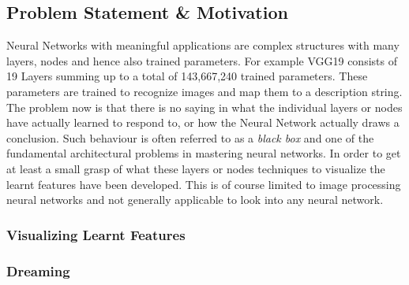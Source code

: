 \subsection{Problem Statement \& Motivation}
\label{sec:problemstatement}
Neural Networks with meaningful applications are complex structures with many layers, nodes and hence also trained parameters.
For example VGG19 consists of 19 Layers summing up to a total of 143,667,240 trained parameters\cite{vgg}. These parameters are trained to recognize images and map them to a description string.
The problem now is that there is no saying in what the individual layers or nodes have actually learned to respond to, or how the Neural Network actually draws a conclusion\cite{castelvecchi2016can}.
Such behaviour is often referred to as a \textit{black box} and one of the fundamental architectural problems in mastering neural networks\cite{olden2002illuminating}.
In order to get at least a small grasp of what these layers or nodes  techniques to visualize the learnt features have been developed.
This is of course limited to image processing neural networks and not generally applicable to look into any neural network.

\subsubsection{Visualizing Learnt Features}

\subsubsection{Dreaming}

